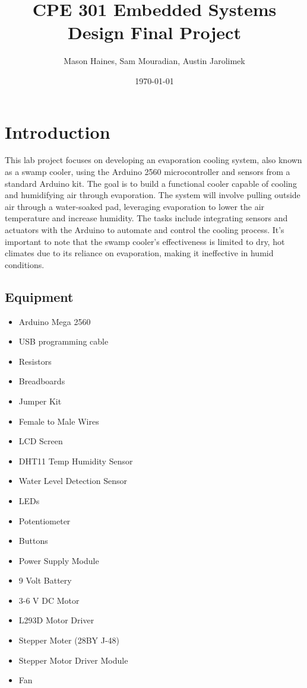 \documentclass{article}
\title{CPE 301 Embedded Systems Design Final Project}
\author{Mason Haines, Sam Mouradian, Austin Jarolimek }
\date{\today}
\begin{document}
\maketitle


\section{Introduction}
This lab project focuses on developing an evaporation cooling system, also known as a swamp cooler, using the Arduino 2560 microcontroller and sensors from a standard Arduino kit. The goal is to build a functional cooler capable of cooling and humidifying air through evaporation. The system will involve pulling outside air through a water-soaked pad, leveraging evaporation to lower the air temperature and increase humidity. The tasks include integrating sensors and actuators with the Arduino to automate and control the cooling process. It's important to note that the swamp cooler's effectiveness is limited to dry, hot climates due to its reliance on evaporation, making it ineffective in humid conditions.


\subsection{Equipment}
\begin{itemize}
    \item Arduino Mega 2560
    \item USB programming cable
    \item Resistors
    \item Breadboards
    \item Jumper Kit
    \item Female to Male Wires
    \item LCD Screen
    \item DHT11 Temp Humidity Sensor
    \item Water Level Detection Sensor
    \item LEDs
    \item Potentiometer
    \item Buttons
    \item Power Supply Module
    \item 9 Volt Battery
    \item 3-6 V DC Motor
    \item L293D Motor Driver
    \item Stepper Moter (28BY J-48)
    \item Stepper Motor Driver Module
    \item Fan

\end{itemize}
\end{document}
